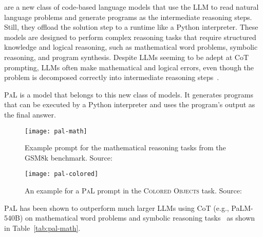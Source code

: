 are a new class of code-based language models that use the LLM to read natural language problems and generate programs as the intermediate reasoning steps.
Still, they offload the solution step to a runtime like a Python interpreter.
These models are designed to perform complex reasoning tasks that require structured knowledge and logical reasoning, such as mathematical word problems, symbolic reasoning, and program synthesis.
Despite LLMs seeming to be adept at CoT prompting, LLMs often make mathematical and logical errors, even though the problem is decomposed correctly into intermediate reasoning steps~\cite{gao2022pal}.

\textsc{PaL} is a model that belongs to this new class of models.
It generates programs that can be executed by a Python interpreter and uses the program's output as the final answer.
\begin{figure}[h!]
	\centering
	\texttt{[image: pal-math]}
	\caption{Example prompt for the mathematical reasoning tasks from the GSM8k benchmark. Source: \textcite{gao2022pal}}
	\label{fig:pal-math}
\end{figure}
\begin{figure}[h!]
	\centering
	\texttt{[image: pal-colored]}
	\caption{An example for a \textsc{PaL} prompt in the \textsc{Colored Objects} task. Source: \textcite{gao2022pal}}
	\label{fig:pal-colored}
\end{figure}
\textsc{PaL} has been shown to outperform much larger LLMs using CoT (e.g., PaLM-540B) on mathematical word problems and symbolic reasoning tasks~\cite{gao2022pal} as shown in Table~\ref{tab:pal-math}.

